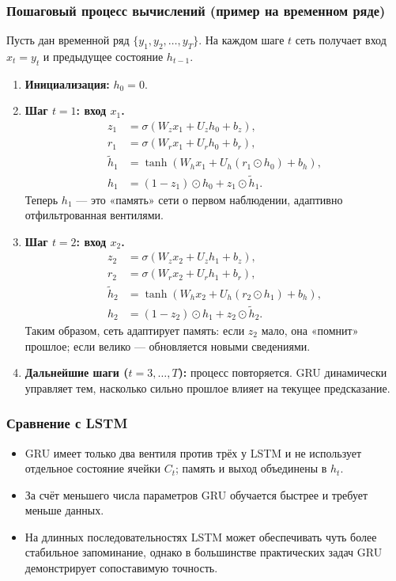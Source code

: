 \documentclass[12pt,a4paper]{article}
\begin{document}
\subsubsection*{Пошаговый процесс вычислений (пример на временном ряде)}

Пусть дан временной ряд \( \{y_1, y_2, \ldots, y_T\} \).
На каждом шаге \(t\) сеть получает вход \(x_t = y_t\) и предыдущее состояние \(h_{t-1}\).

\begin{enumerate}
  \item \textbf{Инициализация:} \(h_0 = 0.\)
  \item \textbf{Шаг $t=1$: вход $x_1$.}
  \begin{align*}
    z_1 &= \sigma(W_z x_1 + U_z h_0 + b_z),\\
    r_1 &= \sigma(W_r x_1 + U_r h_0 + b_r),\\
    \tilde{h}_1 &= \tanh(W_h x_1 + U_h (r_1 \odot h_0) + b_h),\\
    h_1 &= (1 - z_1) \odot h_0 + z_1 \odot \tilde{h}_1.
  \end{align*}
  Теперь $h_1$ — это «память» сети о первом наблюдении, адаптивно отфильтрованная вентилями.

  \item \textbf{Шаг $t=2$: вход $x_2$.}
  \begin{align*}
    z_2 &= \sigma(W_z x_2 + U_z h_1 + b_z),\\
    r_2 &= \sigma(W_r x_2 + U_r h_1 + b_r),\\
    \tilde{h}_2 &= \tanh(W_h x_2 + U_h (r_2 \odot h_1) + b_h),\\
    h_2 &= (1 - z_2) \odot h_1 + z_2 \odot \tilde{h}_2.
  \end{align*}
  Таким образом, сеть адаптирует память: если $z_2$ мало, она «помнит» прошлое; если велико — обновляется новыми сведениями.

  \item \textbf{Дальнейшие шаги ($t=3,\ldots,T$):} процесс повторяется.
  GRU динамически управляет тем, насколько сильно прошлое влияет на текущее предсказание.
\end{enumerate}


\subsubsection*{Сравнение с LSTM}

\begin{itemize}
  \item GRU имеет только два вентиля против трёх у LSTM и не использует отдельное состояние ячейки \(C_t\); память и выход объединены в \(h_t\).
  \item За счёт меньшего числа параметров GRU обучается быстрее и требует меньше данных.
  \item На длинных последовательностях LSTM может обеспечивать чуть более стабильное запоминание, однако в большинстве практических задач GRU демонстрирует сопоставимую точность.
\end{itemize}
\end{document}
